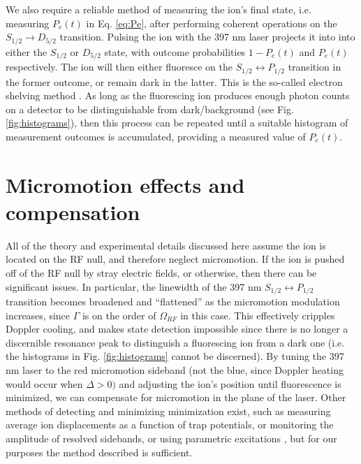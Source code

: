 We also require a reliable method of measuring the ion's final state, i.e. measuring $P_e(t)$ in Eq. \ref{eq:Pe}, after performing coherent operations on the $S_{1/2} \rightarrow D_{5/2}$ transition. Pulsing the ion with the 397 nm laser projects it into into either the $S_{1/2}$ or $D_{5/2}$ state, with outcome probabilities $1 - P_e(t)$ and $P_e(t)$ respectively. The ion will then either fluoresce on the $S_{1/2} \leftrightarrow P_{1/2}$ transition in the former outcome, or remain dark in the latter. This is the so-called electron shelving method \cite{Roos00.Thesis, Leibfried03.RMP.75.281}. As long as the fluorescing ion produces enough photon counts on a detector to be distinguishable from dark/background (see Fig. \ref{fig:histograms}), then this process can be repeated until a suitable histogram of measurement outcomes is accumulated, providing a measured value of $P_e(t)$.  



\section{Micromotion effects and compensation}

All of the theory and experimental details discussed here assume the ion is located on the RF null, and therefore neglect micromotion. If the ion is pushed off of the RF null by stray electric fields, or otherwise, then there can be significant issues. In particular, the linewidth of the 397 nm $S_{1/2} \leftrightarrow P_{1/2}$ transition becomes broadened and ``flattened'' as the micromotion modulation increases, since $\Gamma$ is on the order of $\Omega_{RF}$ in this case. This effectively cripples Doppler cooling, and makes state detection impossible since there is no longer a discernible resonance peak to distinguish a fluorescing ion from a dark one (i.e. the histograms in Fig. \ref{fig:histograms} cannot be discerned). By tuning the 397 nm laser to the red micromotion sideband (not the blue, since Doppler heating would occur when $\Delta > 0)$ and adjusting the ion's position until fluorescence is minimized, we can compensate for micromotion in the plane of the laser. Other methods of detecting and minimizing minimization exist, such as measuring average ion displacements as a function of trap potentials, or monitoring the amplitude of resolved sidebands, or using parametric excitations \cite{Berkeland98.JAP.83.5025, doi:10.1063/1.4930037}, but for our purposes the method described is sufficient.

